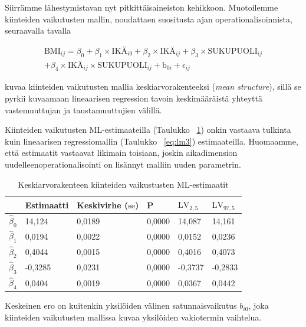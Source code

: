 \documentclass[finnish]{docopts}
\begin{document}
Siirrämme lähestymistavan nyt pitkittäisaineiston kehikkoon. Muotoilemme kiinteiden vaikutusten mallin, noudattaen \cite{fitzmaurice11} suositusta ajan operationalisoinnista, seuraavalla tavalla

\begin{equation}
\begin{split}
 \text{BMI}_{ij} = \beta_0 + \beta_1 \times \text{IKÄ}_{i0} + \beta_2 \times \text{IKÄ}_{ij} + \beta_3 \times \text{SUKUPUOLI}_{ij}  \\
 + \beta_4 \times \text{IKÄ}_{ij} \times \text{SUKUPUOLI}_{ij} + \text{b}_{0i} + \epsilon_{ij}
\label{eq:lme1}
\end{split}
\end{equation}

\cite{west14} kuvaa kiinteiden vaikutusten mallia keskiarvorakenteeksi (\textit{mean structure}), sillä se pyrkii kuvaamaan lineaarisen regression tavoin keskimääräistä yhteyttä vastemuuttujan ja taustamuuttujien välillä.

Kiinteiden vaikutusten ML-estimaateilla (Taulukko ~\ref{table:lme0}) onkin vastaava tulkinta kuin lineaarisen regressiomallin (Taulukko ~\ref{eq:lm3}) estimaateilla. Huomaamme, että estimaatit vastaavat likimain toisiaan, joskin aikadimension uudelleenoperationalisointi on lisännyt malliin uuden parametrin.\\

\begin{table}[H]
\centering
\begin{tabular}{llllll}
\toprule
  & Estimaatti & Keskivirhe ($\text{se}$) & P & $\text{LV}_{2,5}$ & $\text{LV}_{97,5}$\\
\midrule
$\hat{\beta}_0$ & 14,124 & 0,0189 & 0,0000 & 14,087 & 14,161\\
$\hat{\beta}_1$ & 0,0194 & 0,0022 & 0,0000 & 0,0152 & 0,0236\\
$\hat{\beta}_2$ & 0,4044 & 0,0015 & 0,0000 & 0,4016 & 0,4073\\
$\hat{\beta}_3$ & -0,3285 & 0,0231 & 0,0000 & -0,3737 & -0,2833\\
$\hat{\beta}_4$ & 0,0404 & 0,0019 & 0,0000 & 0,0367 & 0,0442\\
\bottomrule
\end{tabular}
\caption{Keskiarvorakenteen kiinteiden vaikustusten ML-estimaatit}
\label{table:lme0}
\end{table}

Keskeinen ero on kuitenkin yksilöiden välinen satunnaisvaikutus $b_{i0}$, joka kiinteiden vaikutusten mallissa kuvaa yksilöiden vakiotermin vaihtelua. \\
\end{document}
